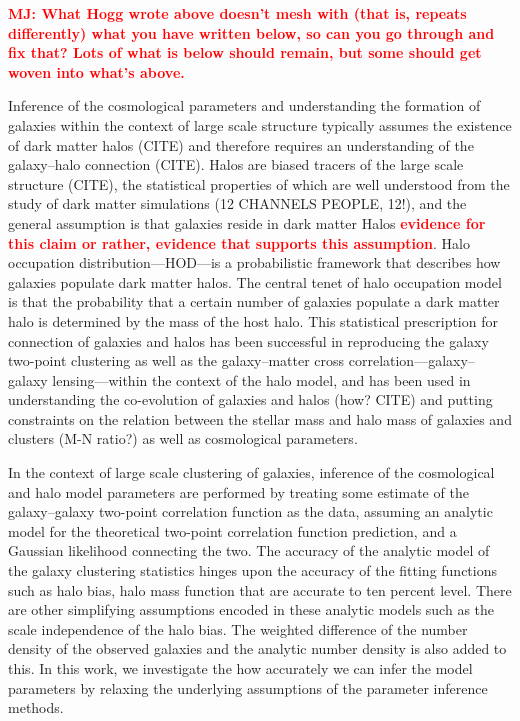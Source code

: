 \documentclass[12pt, preprint]{aastex}
\newcommand{\todo}[1]{{\bf \textcolor{red}{ #1}}}
\begin{document}
\todo{MJ: What Hogg wrote above doesn't mesh with (that is, repeats differently) what you have written below, so can you go through and fix that?  Lots of what is below should remain, but some should get woven into what's above.}


Inference of the cosmological parameters and understanding the formation of galaxies within the context of large scale 
structure typically assumes the existence of dark matter halos (CITE) and therefore requires an understanding of the galaxy--halo connection (CITE). Halos are biased tracers of the large scale structure (CITE), the statistical properties of which are well understood from the study of dark matter simulations (12 CHANNELS PEOPLE, 12!), 
and the general assumption is that galaxies reside in dark matter Halos \todo{evidence for this claim or rather, evidence that supports this assumption}. Halo occupation distribution---HOD---is a probabilistic framework that describes how galaxies populate dark matter halos. The central tenet of halo occupation model is that the probability that a certain number of galaxies populate a dark matter halo is determined by the mass of the host halo. This statistical prescription for connection of galaxies and halos has been successful in reproducing the galaxy two-point clustering as well as the galaxy--matter cross correlation---galaxy--galaxy 
lensing---within the context of the halo model, and has been used in understanding the co-evolution of galaxies and halos (how? CITE) and putting constraints on the relation between the stellar mass and halo mass of galaxies and clusters (M-N ratio?) as well as cosmological parameters.

In the context of large scale clustering of galaxies, inference of the cosmological and halo model parameters are performed by treating some estimate of the galaxy--galaxy two-point correlation function as the data,
assuming an analytic model for the theoretical two-point correlation function prediction,
and a Gaussian likelihood connecting the two.
The accuracy of the analytic model of the galaxy clustering statistics hinges upon the accuracy of the fitting functions such as halo bias, halo mass function that are accurate to ten percent level. There are other simplifying assumptions encoded in these analytic models such as the scale independence of the halo bias. The weighted difference of the number density of the observed galaxies and the analytic number density is also added to this. In this work, we investigate the how accurately we can infer the model parameters by relaxing the underlying assumptions of the parameter inference methods.
\end{document}
